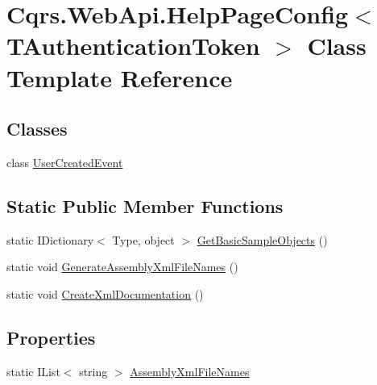 \hypertarget{classCqrs_1_1WebApi_1_1HelpPageConfig}{}\section{Cqrs.\+Web\+Api.\+Help\+Page\+Config$<$ T\+Authentication\+Token $>$ Class Template Reference}
\label{classCqrs_1_1WebApi_1_1HelpPageConfig}
\subsection*{Classes}
\begin{DoxyCompactItemize}
\item 
class \hyperlink{classCqrs_1_1WebApi_1_1HelpPageConfig_1_1UserCreatedEvent}{User\+Created\+Event}
\end{DoxyCompactItemize}
\subsection*{Static Public Member Functions}
\begin{DoxyCompactItemize}
\item 
static I\+Dictionary$<$ Type, object $>$ \hyperlink{classCqrs_1_1WebApi_1_1HelpPageConfig_a9015771102b0ab21da20a0684fe6a88a_a9015771102b0ab21da20a0684fe6a88a}{Get\+Basic\+Sample\+Objects} ()
\item 
static void \hyperlink{classCqrs_1_1WebApi_1_1HelpPageConfig_afc36e0fcbf46ecda7770656373dbd46c_afc36e0fcbf46ecda7770656373dbd46c}{Generate\+Assembly\+Xml\+File\+Names} ()
\item 
static void \hyperlink{classCqrs_1_1WebApi_1_1HelpPageConfig_a9dc5b7b2b644637cd8216ffaac68d545_a9dc5b7b2b644637cd8216ffaac68d545}{Create\+Xml\+Documentation} ()
\end{DoxyCompactItemize}
\subsection*{Properties}
\begin{DoxyCompactItemize}
\item 
static I\+List$<$ string $>$ \hyperlink{classCqrs_1_1WebApi_1_1HelpPageConfig_a62d6b1d61b668f53f5394b26e1c0b0fa_a62d6b1d61b668f53f5394b26e1c0b0fa}{Assembly\+Xml\+File\+Names}
\end{DoxyCompactItemize}


